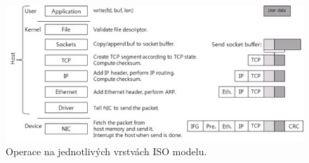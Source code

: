 \begin{figure}[H]
    \centering
    \includegraphics[width=1\linewidth]{operation_process_by_each_layer.png}
    \caption{Operace na jednotlivých vrstvách ISO modelu.}
\end{figure}
